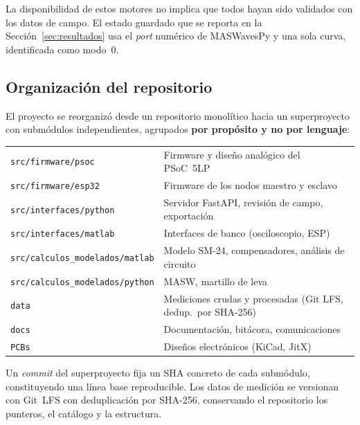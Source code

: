 La disponibilidad de estos motores no implica que todos hayan sido validados con los
datos de campo. El estado guardado que se reporta en la Secci\'on~\ref{sec:resultados}
usa el \emph{port} num\'erico de MASWavesPy y una sola curva, identificada como modo~0.

\subsection{Organizaci\'on del repositorio}

El proyecto se reorganiz\'o desde un repositorio monol\'itico hacia un superproyecto con
subm\'odulos independientes, agrupados \textbf{por prop\'osito y no por lenguaje}:

\begin{center}\footnotesize
\begin{tabular}{@{}ll@{}}
\toprule
\texttt{src/firmware/psoc} & Firmware y dise\~no anal\'ogico del PSoC~5LP \\
\texttt{src/firmware/esp32} & Firmware de los nodos maestro y esclavo \\
\texttt{src/interfaces/python} & Servidor FastAPI, revisi\'on de campo, exportaci\'on \\
\texttt{src/interfaces/matlab} & Interfaces de banco (osciloscopio, ESP) \\
\texttt{src/calculos\_modelados/matlab} & Modelo SM-24, compensadores, an\'alisis de circuito \\
\texttt{src/calculos\_modelados/python} & MASW, martillo de leva \\
\texttt{data} & Mediciones crudas y procesadas (Git LFS, dedup.\ por SHA-256) \\
\texttt{docs} & Documentaci\'on, bit\'acora, comunicaciones \\
\texttt{PCBs} & Dise\~nos electr\'onicos (KiCad, JitX) \\
\bottomrule
\end{tabular}
\end{center}

Un \emph{commit} del superproyecto fija un SHA concreto de cada subm\'odulo, constituyendo
una l\'inea base reproducible. Los datos de medici\'on se versionan con Git~LFS con
deduplicaci\'on por SHA-256, conservando el repositorio los punteros, el cat\'alogo y la
estructura.


